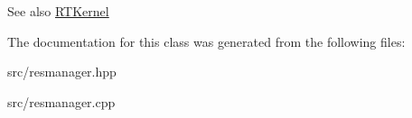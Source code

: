 \begin{DoxySeeAlso}{See also}
\hyperlink{classRTSim_1_1RTKernel}{R\+T\+Kernel} 
\end{DoxySeeAlso}


The documentation for this class was generated from the following files\+:\begin{DoxyCompactItemize}
\item 
src/resmanager.\+hpp\item 
src/resmanager.\+cpp\end{DoxyCompactItemize}
